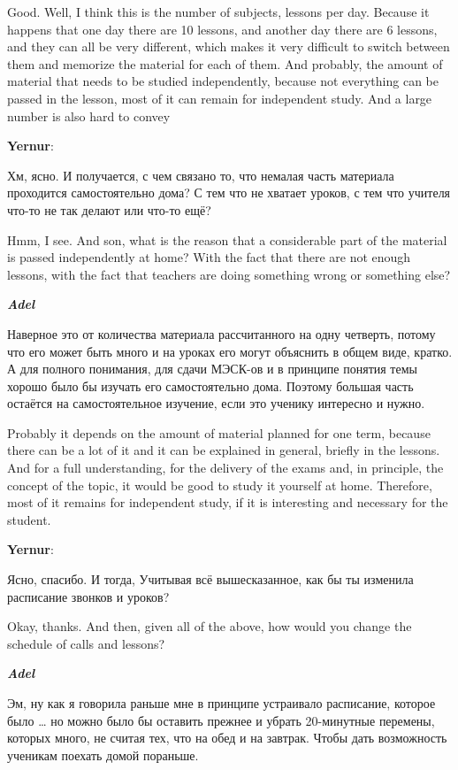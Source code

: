 Good. Well, I think this is the number of subjects, lessons per day. Because it happens that one day there are 10 lessons, and another day there are 6 lessons, and they can all be very different, which makes it very difficult to switch between them and memorize the material for each of them. And probably, the amount of material that needs to be studied independently, because not everything can be passed in the lesson, most of it can remain for independent study. And a large number is also hard to convey 

\textbf{Yernur}: 

Хм, ясно. И получается, с чем связано то, что немалая часть материала проходится самостоятельно дома? С тем что не хватает уроков, с тем что учителя что-то не так делают или что-то ещё? 

Hmm, I see. And son, what is the reason that a considerable part of the material is passed independently at home? With the fact that there are not enough lessons, with the fact that teachers are doing something wrong or something else?

\textbf{\textit{Adel}}

Наверное это от количества материала рассчитанного на одну четверть, потому что его может быть много и на уроках его могут объяснить в общем виде, кратко. А для полного понимания, для сдачи МЭСК-ов и в принципе понятия темы хорошо было бы изучать его самостоятельно дома. Поэтому большая часть остаётся на самостоятельное изучение, если это ученику интересно и нужно.

Probably it depends on the amount of material planned for one term, because there can be a lot of it and it can be explained in general, briefly in the lessons. And for a full understanding, for the delivery of the exams and, in principle, the concept of the topic, it would be good to study it yourself at home. Therefore, most of it remains for independent study, if it is interesting and necessary for the student.

\textbf{Yernur}: 

Ясно, спасибо. И тогда, Учитывая всё вышесказанное, как бы ты изменила расписание звонков и уроков? 

Okay, thanks. And then, given all of the above, how would you change the schedule of calls and lessons?

\textbf{\textit{Adel}}

Эм, ну как я говорила раньше мне в принципе устраивало расписание, которое было … но можно было бы оставить прежнее и убрать 20-минутные перемены, которых много, не считая тех, что на обед и на завтрак. Чтобы дать возможность ученикам поехать домой пораньше.

